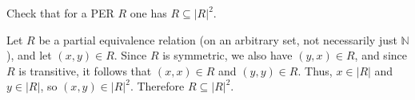 \begin{exercise}
Check that for a PER \(R\) one has \(R \subseteq \left|R\right|^2\).
\end{exercise}

\begin{solution}
Let \(R\) be a partial equivalence relation (on an arbitrary set, not necessarily just \(\mathbb{N}\)), and let \((x, y) \in R\).
Since \(R\) is symmetric, we also have \((y, x) \in R\), and since \(R\) is transitive, it follows that \((x, x) \in R\) and \((y, y) \in R\).
Thus, \(x \in |R|\) and \(y \in |R|\), so \((x, y) \in \left|R\right|^2\).
Therefore \(R \subseteq \left|R\right|^2\).
\end{solution}
